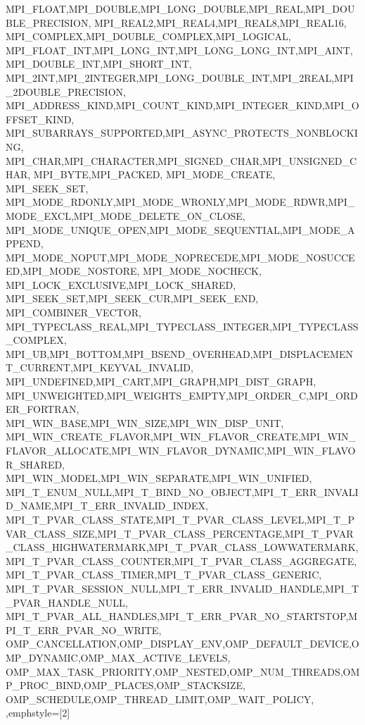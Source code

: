 {{{{{    MPI_FLOAT,MPI_DOUBLE,MPI_LONG_DOUBLE,MPI_REAL,MPI_DOUBLE_PRECISION,
    MPI_REAL2,MPI_REAL4,MPI_REAL8,MPI_REAL16,
    MPI_COMPLEX,MPI_DOUBLE_COMPLEX,MPI_LOGICAL,
    MPI_FLOAT_INT,MPI_LONG_INT,MPI_LONG_LONG_INT,MPI_AINT,MPI_DOUBLE_INT,MPI_SHORT_INT,
    MPI_2INT,MPI_2INTEGER,MPI_LONG_DOUBLE_INT,MPI_2REAL,MPI_2DOUBLE_PRECISION,
    MPI_ADDRESS_KIND,MPI_COUNT_KIND,MPI_INTEGER_KIND,MPI_OFFSET_KIND,
    MPI_SUBARRAYS_SUPPORTED,MPI_ASYNC_PROTECTS_NONBLOCKING,
    MPI_CHAR,MPI_CHARACTER,MPI_SIGNED_CHAR,MPI_UNSIGNED_CHAR,
    MPI_BYTE,MPI_PACKED, MPI_MODE_CREATE,
    MPI_SEEK_SET,
    MPI_MODE_RDONLY,MPI_MODE_WRONLY,MPI_MODE_RDWR,MPI_MODE_EXCL,MPI_MODE_DELETE_ON_CLOSE,
    MPI_MODE_UNIQUE_OPEN,MPI_MODE_SEQUENTIAL,MPI_MODE_APPEND,
    MPI_MODE_NOPUT,MPI_MODE_NOPRECEDE,MPI_MODE_NOSUCCEED,MPI_MODE_NOSTORE,
    MPI_MODE_NOCHECK, MPI_LOCK_EXCLUSIVE,MPI_LOCK_SHARED,
    MPI_SEEK_SET,MPI_SEEK_CUR,MPI_SEEK_END,
    MPI_COMBINER_VECTOR,
    MPI_TYPECLASS_REAL,MPI_TYPECLASS_INTEGER,MPI_TYPECLASS_COMPLEX,
    MPI_UB,MPI_BOTTOM,MPI_BSEND_OVERHEAD,MPI_DISPLACEMENT_CURRENT,MPI_KEYVAL_INVALID,
    MPI_UNDEFINED,MPI_CART,MPI_GRAPH,MPI_DIST_GRAPH,
    MPI_UNWEIGHTED,MPI_WEIGHTS_EMPTY,MPI_ORDER_C,MPI_ORDER_FORTRAN,
    MPI_WIN_BASE,MPI_WIN_SIZE,MPI_WIN_DISP_UNIT,
    MPI_WIN_CREATE_FLAVOR,MPI_WIN_FLAVOR_CREATE,MPI_WIN_FLAVOR_ALLOCATE,MPI_WIN_FLAVOR_DYNAMIC,MPI_WIN_FLAVOR_SHARED,
    MPI_WIN_MODEL,MPI_WIN_SEPARATE,MPI_WIN_UNIFIED,
    MPI_T_ENUM_NULL,MPI_T_BIND_NO_OBJECT,MPI_T_ERR_INVALID_NAME,MPI_T_ERR_INVALID_INDEX,
    MPI_T_PVAR_CLASS_STATE,MPI_T_PVAR_CLASS_LEVEL,MPI_T_PVAR_CLASS_SIZE,MPI_T_PVAR_CLASS_PERCENTAGE,MPI_T_PVAR_CLASS_HIGHWATERMARK,MPI_T_PVAR_CLASS_LOWWATERMARK,MPI_T_PVAR_CLASS_COUNTER,MPI_T_PVAR_CLASS_AGGREGATE,MPI_T_PVAR_CLASS_TIMER,MPI_T_PVAR_CLASS_GENERIC,
    MPI_T_PVAR_SESSION_NULL,MPI_T_ERR_INVALID_HANDLE,MPI_T_PVAR_HANDLE_NULL,
    MPI_T_PVAR_ALL_HANDLES,MPI_T_ERR_PVAR_NO_STARTSTOP,MPI_T_ERR_PVAR_NO_WRITE,
    OMP_CANCELLATION,OMP_DISPLAY_ENV,OMP_DEFAULT_DEVICE,OMP_DYNAMIC,OMP_MAX_ACTIVE_LEVELS,
    OMP_MAX_TASK_PRIORITY,OMP_NESTED,OMP_NUM_THREADS,OMP_PROC_BIND,OMP_PLACES,OMP_STACKSIZE,
    OMP_SCHEDULE,OMP_THREAD_LIMIT,OMP_WAIT_POLICY,
  },emphstyle={[2]\color{green!40!black}}
}

}}}
